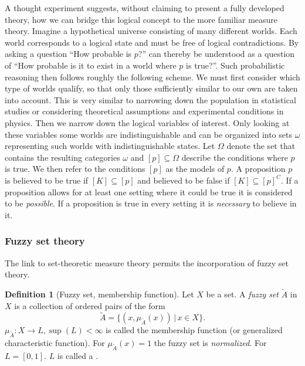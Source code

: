 \documentclass[
]{report}
\theoremstyle{definition}
\newtheorem{definition}{Definition}[section]
\begin{document}
A thought experiment suggests, without claiming to present a fully
developed theory, how we can bridge this logical concept to the more
familiar measure theory. Imagine a hypothetical universe consisting of
many different worlds. Each world corresponds to a logical state and
must be free of logical contradictions. By asking a question ``How
probable is \(p\)?'' can thereby be understood as a question of ``How
probable is it to exist in a world where \(p\) is true?''. Such
probabilistic reasoning then follows roughly the following scheme. We
must first consider which type of worlds qualify, so that only those
sufficiently similar to our own are taken into account. This is very
similar to narrowing down the population in statistical studies or
considering theoretical assumptions and experimental conditions in
physics. Then we narrow down the logical variables of interest. Only
looking at these variables some worlds are indistinguishable and can be
organized into sets \(\omega\) representing such worlds with
indistinguishable states. Let \(\Omega\) denote the set that contains
the resulting categories \(\omega\) and \([p] \subseteq \Omega\)
describe the conditions where \(p\) is true. We then refer to the
conditions \([p]\) as the models of \(p\). A proposition \(p\) is
believed to be true if \([K] \subseteq [p]\) and believed to be false if
\([K] \subseteq [p]^C\). If a proposition allows for at least one
setting where it could be true it is considered to be \textit{possible}.
If a proposition is true in every setting it is \textit{necessary} to
believe in it.

\subsubsection{Fuzzy set theory}

The link to set-theoretic measure theory permits the incorporation of
fuzzy set theory.

\begin{definition}[Fuzzy set, membership function]
Let $X$ be a set. A \textit{fuzzy set} $\tilde{A}$ in $X$ is a collection of ordered pairs of the form
$$\tilde{A} = \big\{ (x, \mu_{\tilde{A}}(x)) \, | \, x \in X \big\}.$$
$\mu_{\tilde{A}}: X \rightarrow L, \sup(L) < \infty$ is called the membership function (or generalized characteristic function). For $\mu_{\tilde{A}} (x) = 1$ the fuzzy set is \textit{normalized}. For $L = [0,1]$. $L$ is called a .
\end{definition}
\end{document}
